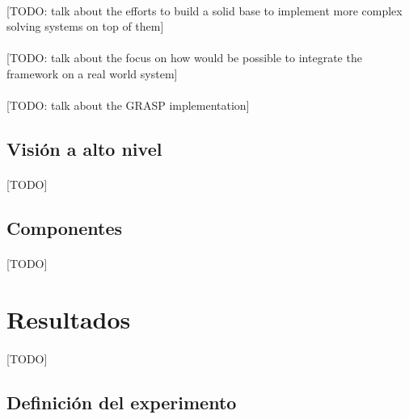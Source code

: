 \documentclass{subfiles}
\begin{document}
        \paragraph{}
        [TODO: talk about the efforts to build a solid base to implement more complex solving systems on top of them]
        
        \paragraph{}
        [TODO: talk about the focus on how would be possible to integrate the framework on a real world system]

        \paragraph{}
        [TODO: talk about the GRASP implementation]


      \subsection{Visión a alto nivel}
      \label{sec:implementation_high_level_vision}

        \paragraph{}
        [TODO]

      \subsection{Componentes}
      \label{sec:implementation_components}

        \paragraph{}
        [TODO]

    \section{Resultados}
    \label{sec:results}

      \paragraph{}
      [TODO]

      \subsection{Definición del experimento}
      \label{sec:results_definition}
\end{document}

